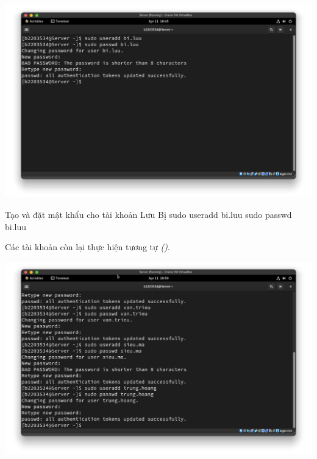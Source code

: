 \begin{minipage}{.93\linewidth}
  \captionsetup{type=figure, skip=-15pt}
  \includegraphics[width=\linewidth]{./imgs/Hinh-12.png}
  \caption{\bfseries Tạo và đặt mật khẩu cho tài khoản Lưu Bị}
  \label{fig:useradd-luubi}
\end{minipage}

\vspace{0.5cm}
\begin{bashlisting}{Tạo và đặt mật khẩu cho tài khoản Lưu Bị}
  sudo useradd bi.luu
  sudo passwd bi.luu
\end{bashlisting}

Các tài khoản còn lại thực hiện tương tự \textit{()}.

\begin{minipage}{.93\linewidth}
  \captionsetup{type=figure, skip=-15pt}
  \includegraphics[width=\linewidth]{./imgs/Hinh-13.png}
  \caption{\bfseries Tạo và đặt mật khẩu cho các tài khoản còn lại}
  \label{fig:useradd-other}
\end{minipage}

